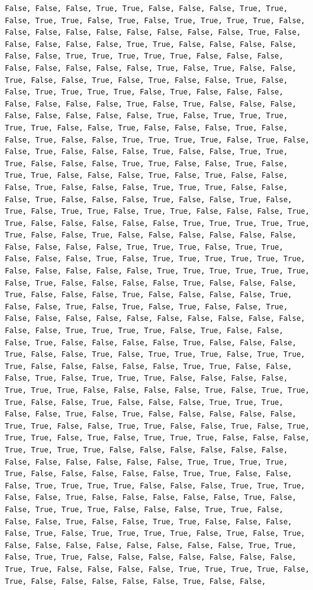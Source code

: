 \documentclass[
  letterpaper,
  DIV=11,
  numbers=noendperiod]{scrartcl}
\begin{document}
\begin{verbatim}
False, False, False, True, True, False, False, False, True, True, False, True, True, False, True, False, True, True, True, True, False, False, False, False, False, False, False, False, False, True, False, False, False, False, False, True, True, False, False, False, False, False, False, True, True, True, True, True, False, False, False, False, False, False, False, False, True, False, True, False, False, True, False, False, True, False, True, False, False, True, False, False, True, True, True, True, False, True, False, False, False, False, False, False, False, True, False, True, False, False, False, False, False, False, False, False, True, False, True, True, True, True, True, False, False, True, False, False, False, True, False, False, True, False, False, True, True, True, True, False, True, False, False, True, False, False, False, True, False, False, True, True, True, False, False, False, True, True, False, False, True, False, True, True, False, False, False, True, False, True, False, False, False, True, False, False, False, True, True, True, False, False, False, True, False, False, False, True, False, False, True, False, True, False, True, True, False, True, True, False, False, False, True, True, False, False, False, False, False, True, True, True, True, True, True, False, False, True, False, False, False, False, False, False, False, False, False, False, True, True, True, False, True, True, False, False, False, True, False, True, True, True, True, True, True, False, False, False, False, False, True, True, True, True, True, True, False, True, False, False, False, False, True, False, False, False, True, False, False, False, True, False, False, False, False, True, False, False, True, False, True, False, True, False, False, True, False, False, False, False, False, False, False, False, False, False, False, False, True, True, True, True, False, True, False, False, False, True, False, False, False, False, True, False, False, False, True, False, False, True, False, True, True, True, False, True, True, True, False, False, False, False, False, True, True, False, False, False, True, False, True, True, True, False, False, False, False, True, True, True, False, False, False, False, True, False, True, True, True, False, False, True, False, False, False, True, True, True, False, False, True, False, True, False, False, False, False, False, True, True, False, False, True, True, False, False, True, False, True, True, True, False, True, False, True, True, True, False, False, False, True, True, True, True, False, False, False, False, False, False, False, False, False, False, False, False, True, True, True, True, True, False, False, False, False, False, True, True, False, False, False, True, True, True, True, False, False, False, True, True, True, False, False, True, False, False, False, False, False, True, False, False, True, True, True, False, False, False, True, True, False, False, False, True, False, False, True, True, False, False, False, False, True, False, True, True, True, True, False, True, False, True, False, False, False, False, False, False, False, False, True, True, False, True, True, False, False, False, False, False, False, False, True, True, False, False, False, False, True, True, True, True, False, True, False, False, False, False, False, True, False, False, 
\end{verbatim}
\end{document}
